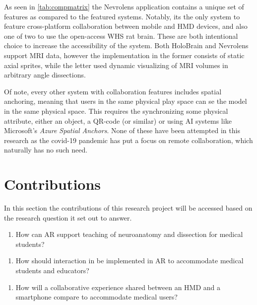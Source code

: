 As seen in \autoref{tab:compmatrix} the Nevrolens application contains a unique set of features as compared to the featured systems. Notably, its the only system to feature cross-platform collaboration between mobile and HMD devices, and also one of two to use the open-access WHS rat brain. These are both intentional choice to increase the accessibility of the system.
Both HoloBrain and Nevrolens support MRI data, however the implementation in the former consists of static axial sprites, while the letter used dynamic visualizing of MRI volumes in arbitrary angle dissections.

Of note, every other system with collaboration features includes spatial anchoring, meaning that users in the same physical play space can se the model in the same physical space. This requires the synchronizing some physical attribute, either an object, a QR-code (or similar) or using AI systems like Microsoft's \textit{Azure Spatial Anchors}. None of these have been attempted in this research as the covid-19 pandemic has put a focus on remote collaboration, which naturally has no such need.

\section{Contributions}
In this section the contributions of this research project will be accessed based on the research question it set out to answer. 


\begin{enumerate}[label=\textbf{RQ1:}, left=\parindent]
    \itshape
    \item How can AR support teaching of neuroanatomy and dissection for medical students?
\end{enumerate}

\begin{enumerate}[label=\textbf{RQ2:}, left=\parindent]
    
    \itshape
    \item How should interaction in be implemented in AR to accommodate medical students and educators?
\end{enumerate}

\begin{enumerate}[label=\textbf{RQ3:}, left=\parindent]
    \itshape
    \item How will a collaborative experience shared between an HMD and a smartphone compare to accommodate medical users?
\end{enumerate}


